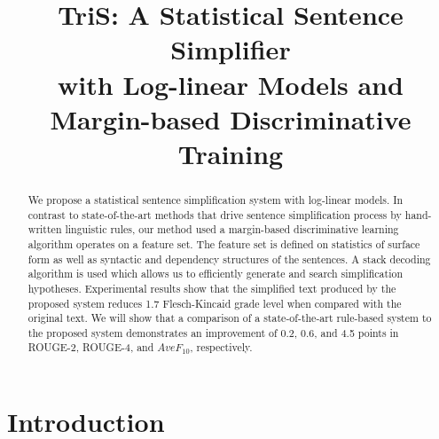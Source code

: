 \documentclass[10pt]{article}
\title{TriS: A Statistical Sentence Simplifier \\with Log-linear Models and Margin-based Discriminative Training}
\date{}
\begin{document}
\maketitle
\begin{abstract}

We propose a statistical sentence simplification system with log-linear models. 
In contrast to state-of-the-art methods that drive sentence simplification process by hand-written linguistic rules, our method used a margin-based discriminative learning algorithm operates on a feature set. 
The feature set is defined on statistics of surface form as well as syntactic and dependency structures of the sentences. 
A stack decoding algorithm is used which allows us to efficiently generate and search simplification hypotheses. 
Experimental results show that the simplified text produced by the proposed system reduces 1.7 Flesch-Kincaid grade level when compared with the original text. 
We will show that a comparison of a state-of-the-art rule-based system \cite{HeilmanSmith:2010} to the proposed system demonstrates an improvement of 0.2, 0.6, and 4.5 points in ROUGE-2, ROUGE-4, and $AveF_{10}$, respectively.


\end{abstract}


\section{Introduction}
\end{document}
